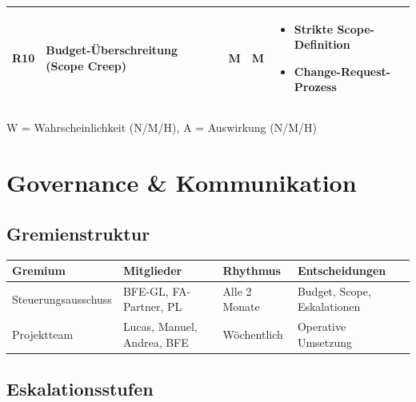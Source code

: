 \documentclass[11pt,a4paper]{article}
\begin{document}
\begin{longtable}{c p{4cm} c c p{4cm}}
\rowcolor{faorange!20}
R10 & Budget-Überschreitung (Scope Creep) & M & M &
    \begin{minipage}[t]{4cm}
    \vspace{0.1cm}
    \begin{itemize}[leftmargin=*, nosep, font=\small]
        \item Strikte Scope-Definition
        \item Change-Request-Prozess
    \end{itemize}
    \vspace{0.1cm}
    \end{minipage}\\

\bottomrule
\end{longtable}

{\small W = Wahrscheinlichkeit (N/M/H), A = Auswirkung (N/M/H)}

\newpage

\section{Governance \& Kommunikation}

\subsection{Gremienstruktur}

\begin{tabular}{l l l p{4cm}}
\toprule
\textbf{Gremium} & \textbf{Mitglieder} & \textbf{Rhythmus} & \textbf{Entscheidungen}\\
\midrule
\rowcolor{falightgray}
Steuerungsausschuss & BFE-GL, FA-Partner, PL & Alle 2 Monate & Budget, Scope, Eskalationen\\
Projektteam & Lucas, Manuel, Andrea, BFE & Wöchentlich & Operative Umsetzung\\
\bottomrule
\end{tabular}

\subsection{Eskalationsstufen}
\end{document}
